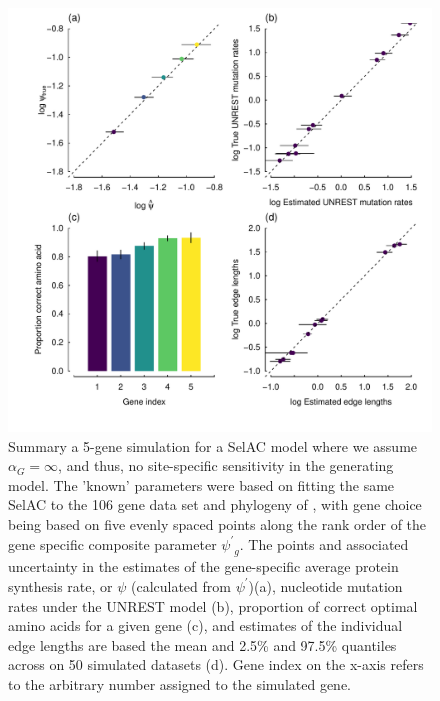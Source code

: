 \documentclass[12pt,letterpaper]{article}
\newcommand{\alphag}{\ensuremath{\alpha_G}\xspace}
\newcommand{\psiprime}{\ensuremath{\psi^\prime}\xspace}
\begin{document}
\begin{figure}[H]
  \centering
  \includegraphics[width=0.9\linewidth]{FIGURE_S3_5genes_ALL_UNREST_Selac_NoG.pdf}
  \caption{Summary a 5-gene simulation for a SelAC model where we assume $\alphag = \infty$, and thus, no site-specific sensitivity in the generating model.
		The 'known' parameters were based on fitting the same SelAC to the 106 gene data set and phylogeny of \citet{RokasEtAl2003}, with gene choice being based on five evenly spaced points along the rank order of the gene specific composite parameter $\psiprime_g$.
		The points and associated uncertainty in the estimates of the gene-specific average protein synthesis rate, or $\psi$ (calculated from $\psiprime$)(a), nucleotide mutation rates under the UNREST model (b), proportion of correct optimal amino acids for a given gene (c), and estimates of the individual edge lengths are based the mean and 2.5\% and 97.5\% quantiles across on 50 simulated datasets (d).
		Gene index on the x-axis refers to the arbitrary number assigned to the simulated gene.
}
  \label{fig:SelacNoGSimRes}
\end{figure}
\end{document}

